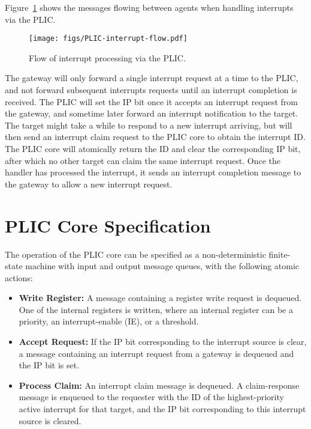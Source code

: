 Figure~\ref{fig:intflow} shows the messages flowing between agents
when handling interrupts via the PLIC.

\begin{figure}[hb!]
\centering
\texttt{[image: figs/PLIC-interrupt-flow.pdf]}
\caption{ Flow of interrupt processing via the PLIC.}
\label{fig:intflow}
\end{figure}

The gateway will only forward a single interrupt request at a time to
the PLIC, and not forward subsequent interrupts requests until an
interrupt completion is received.  The PLIC will set the IP bit once
it accepts an interrupt request from the gateway, and sometime later
forward an interrupt notification to the target.  The target might
take a while to respond to a new interrupt arriving, but will then
send an interrupt claim request to the PLIC core to obtain the
interrupt ID.  The PLIC core will atomically return the ID and clear
the corresponding IP bit, after which no other target can claim the
same interrupt request.  Once the handler has processed the interrupt,
it sends an interrupt completion message to the gateway to allow a new
interrupt request.

\section{PLIC Core Specification}

The operation of the PLIC core can be specified as a non-deterministic
finite-state machine with input and output message queues, with the
following atomic actions:

\begin{itemize}

\item {\bf Write Register: } A message containing a register write
  request is dequeued.  One of the internal registers is written,
  where an internal register can be a priority, an interrupt-enable
  (IE), or a threshold.

\item {\bf Accept Request: } If the IP bit corresponding to the
  interrupt source is clear, a message containing an interrupt request
  from a gateway is dequeued and the IP bit is set.

\item {\bf Process Claim: } An interrupt claim message is dequeued.  A
  claim-response message is enqueued to the requester with the ID of
  the highest-priority active interrupt for that target, and the IP
  bit corresponding to this interrupt source is cleared.

\end{itemize}

